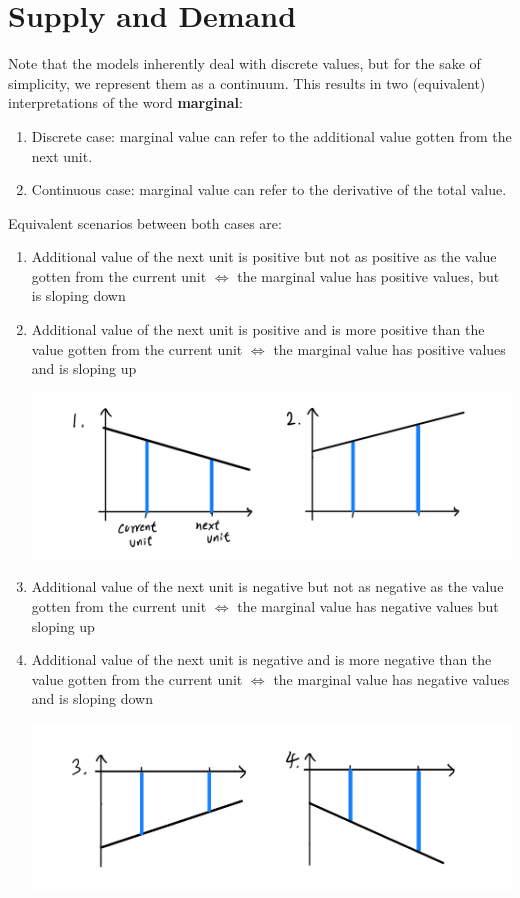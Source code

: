 \documentclass{article}
\begin{document}
\section{Supply and Demand}

  Note that the models inherently deal with discrete values, but for the sake of simplicity, we represent them as a continuum. This results in two (equivalent) interpretations of the word \textbf{marginal}: 
  \begin{enumerate}
    \item Discrete case: marginal value can refer to the additional value gotten from the next unit. 
    \item Continuous case: marginal value can refer to the derivative of the total value. 
  \end{enumerate}
  Equivalent scenarios between both cases are: 
  \begin{enumerate}
    \item Additional value of the next unit is positive but not as positive as the value gotten from the current unit $\iff$ the marginal value has positive values, but is sloping down
    \item Additional value of the next unit is positive and is more positive than the value gotten from the current unit $\iff$ the marginal value has positive values and is sloping up
    \begin{center}
      \includegraphics[scale=0.25]{img/12.PNG}
    \end{center}
    \item Additional value of the next unit is negative but not as negative as the value gotten from the current unit $\iff$ the marginal value has negative values but sloping up
    \item Additional value of the next unit is negative and is more negative than the value gotten from the current unit $\iff$ the marginal value has negative values and is sloping down
    \begin{center}
      \includegraphics[scale=0.25]{img/34.PNG}
    \end{center}
  \end{enumerate}
\end{document}
